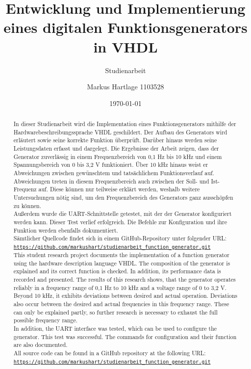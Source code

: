\documentclass[BCOR=1cm, ngerman]{scrreprt}
\title{Entwicklung und Implementierung eines digitalen Funktionsgenerators in VHDL}
\subtitle{Studienarbeit}
\author{Markus Hartlage 1103528}
\date{\today} %
\newcommand{\code}[1]{\texttt{#1}}
\begin{document}
\maketitle

\begin{abstract}
  In dieser Studienarbeit wird die Implementation eines Funktionsgenerators mithilfe der Hardwarebeschreibungssprache VHDL geschildert.
  Der Aufbau des Generators wird erläutert sowie seine korrekte Funktion überprüft.
  Darüber hinaus werden seine Leistungsdaten erfasst und dargelegt.
  Die Ergebnisse der Arbeit zeigen, dass der Generator zuverlässig in einem Frequenzbereich von 0,1 Hz bis 10 kHz und einem Spannungsbereich von 0 bis 3,2 V funktioniert.
  Über 10 kHz hinaus weist er Abweichungen zwischen gewünschtem und tatsächlichem Funktionsverlauf auf.
  Abweichungen treten in diesem Frequenzbereich auch zwischen der Soll- und Ist-Frequenz auf.
  Diese können nur teilweise erklärt werden, weshalb weitere Untersuchungen nötig sind, um den Frequenzbereich des Generators ganz ausschöpfen zu können. \\
  Außerdem wurde die UART-Schnittstelle getestet, mit der der Generator konfiguriert werden kann.
  Dieser Test verlief erfolgreich. Die Befehle zur Konfiguration und ihre Funktion werden ebenfalls dokumentiert. \\
  Sämtlicher Quellcode findet sich in einem GitHub-Repository unter folgender URL: \\
  \href{https://github.com/markushart/studienarbeit_function_generator.git}{\code{https://github.com/markushart/studienarbeit\_function\_generator.git}}
  \\

  This student research project documents the implementation of a function generator using the hardware description language VHDL.
  The composition of the generator is explained and its correct function is checked.
  In addition, its performance data is recorded and presented.
  The results of this research shows, that the generator operates reliably in a frequency range of 0,1 Hz to 10 kHz and a voltage range of 0 to 3,2 V.
  Beyond 10 kHz, it exhibits deviations between desired and actual operation.
  Deviations also occur between the desired and actual frequencies in this frequency range.
  These can only be explained partly, so further research is necessary to exhaust the full possible frequency range. \\
  In addition, the UART interface was tested, which can be used to configure the generator.
  This test was successful. The commands for configuration and their function are also documented. \\
  All source code can be found in a GitHub repository at the following URL: \\
  \href{https://github.com/markushart/studienarbeit_function_generator.git}{\code{https://github.com/markushart/studienarbeit\_function\_generator.git}}
  \\

\end{abstract}
\end{document}
